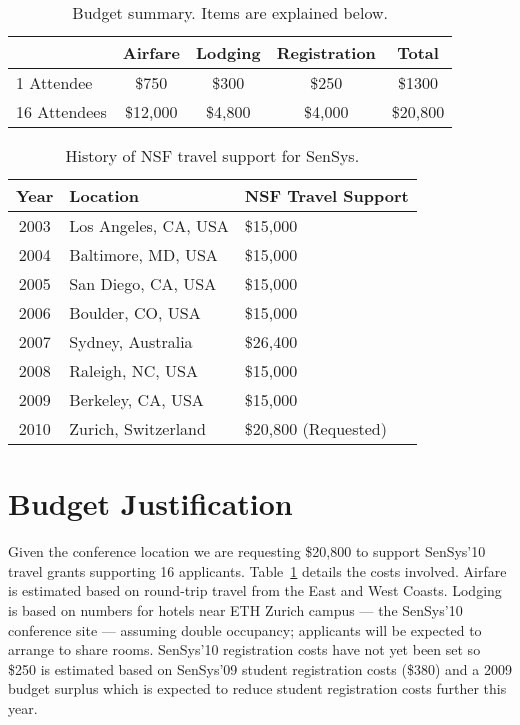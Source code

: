 \documentclass[11pt,letterpaper]{article}
\begin{document}
\begin{table}[t]
\begin{center}
\begin{tabular}{|l|ccc|c|}
\hline
& \textbf{Airfare} & \textbf{Lodging} & \textbf{Registration} & \textbf{Total} \\
\hline \hline
1 Attendee & \$750 & \$300 & \$250 & \$1300 \\
16 Attendees & \$12,000 & \$4,800 & \$4,000 & \$20,800 \\
\hline
\end{tabular}
\end{center}
\caption{Budget summary. Items are explained below.}
\label{table-budget}
\end{table}

\begin{table}[t]
\begin{center}
\begin{tabular}{|c|ll|}
\hline
\textbf{Year} & \textbf{Location} & \textbf{NSF Travel Support} \\
\hline \hline
2003 & Los Angeles, CA, USA & \$15,000 \\
2004 & Baltimore, MD, USA & \$15,000 \\
2005 & San Diego, CA, USA & \$15,000 \\
2006 & Boulder, CO, USA & \$15,000 \\
2007 & Sydney, Australia & \$26,400 \\
2008 & Raleigh, NC, USA & \$15,000 \\
2009 & Berkeley, CA, USA & \$15,000 \\
2010 & Zurich, Switzerland & \$20,800 (Requested) \\
\hline
\end{tabular}
\end{center}
\caption{History of NSF travel support for SenSys.}
\label{table-history}
\end{table}

\section*{Budget Justification}
\label{sec-budget}

Given the conference location we are requesting \$20,800 to support SenSys'10
travel grants supporting 16 applicants. Table~\ref{table-budget} details the
costs involved. Airfare is estimated based on round-trip travel from the East
and West Coasts. Lodging is based on numbers for hotels near ETH Zurich
campus --- the SenSys'10 conference site --- assuming double occupancy;
applicants will be expected to arrange to share rooms. SenSys'10 registration
costs have not yet been set so \$250 is estimated based on SenSys'09 student
registration costs (\$380) and a 2009 budget surplus which is expected to
reduce student registration costs further this year.
\end{document}
